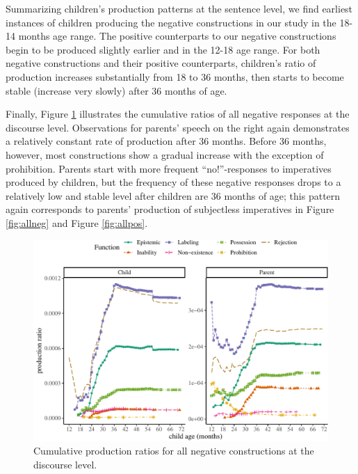 \documentclass[
  man,floatsintext]{apa6}
\begin{document}
Summarizing children's production patterns at the sentence level, we find earliest instances of children producing the negative constructions in our study in the 18-14 months age range. The positive counterparts to our negative constructions begin to be produced slightly earlier and in the 12-18 age range. For both negative constructions and their positive counterparts, children's ratio of production increases substantially from 18 to 36 months, then starts to become stable (increase very slowly) after 36 months of age.

Finally, Figure \ref{fig:alldiscourse} illustrates the cumulative ratios of all negative responses at the discourse level. Observations for parents' speech on the right again demonstrates a relatively constant rate of production after 36 months. Before 36 months, however, most constructions show a gradual increase with the exception of prohibition. Parents start with more frequent ``no!''-responses to imperatives produced by children, but the frequency of these negative responses drops to a relatively low and stable level after children are 36 months of age; this pattern again corresponds to parents' production of subjectless imperatives in Figure \ref{fig:allneg} and Figure \ref{fig:allpos}.

\begin{figure}[H]

{\centering \includegraphics{neg_construction_article_files/figure-latex/alldiscourse-1} 

}

\caption{Cumulative production ratios for all negative constructions at the discourse level.}\label{fig:alldiscourse}
\end{figure}
\end{document}
